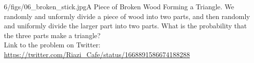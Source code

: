 \begin{problem}{6/figs/06_broken_stick.jpg}{A Piece of Broken Wood Forming a Triangle}.
We randomly and unformly divide a piece of wood into two parts, and then randomly and uniformly  divide the larger part into two parts. What is the probability that the three parts make a triangle?\\[0.2cm]

Link to the problem on Twitter:  \url{https://twitter.com/Riazi_Cafe/status/1668891586674188288}\end{problem}